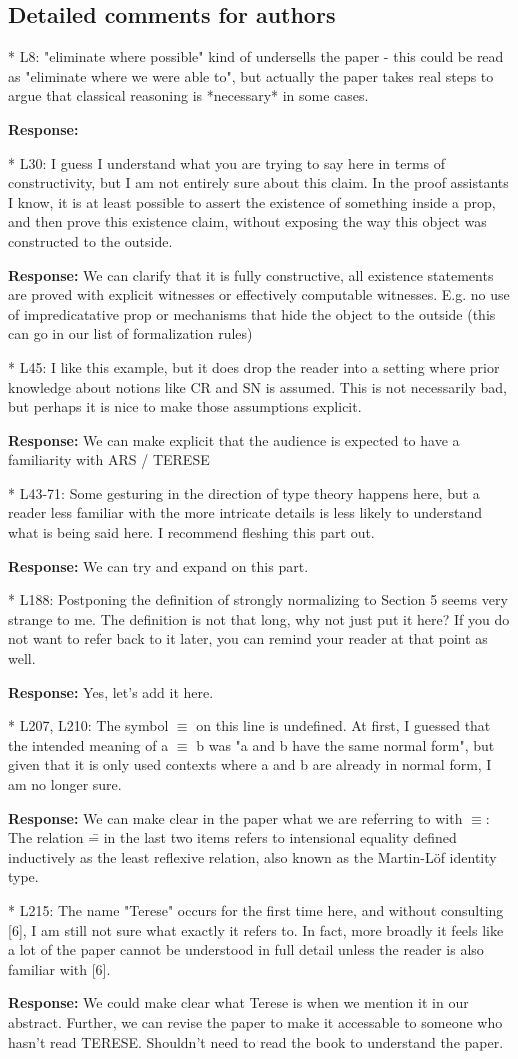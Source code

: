 \documentclass[11pt]{article}
\newcommand{\res}[1]{\par\noindent\textbf{Response:} #1\par}
\begin{document}
\subsection*{Detailed comments for authors}
* L8: "eliminate where possible" kind of undersells the paper - this could be
read as "eliminate where we were able to", but actually the paper takes real
steps to argue that classical reasoning is *necessary* in some cases.
\res{}
* L30: I guess I understand what you are trying to say here in terms of
constructivity, but I am not entirely sure about this claim. In the proof
assistants I know, it is at least possible to assert the existence of
something inside a prop, and then prove this existence claim, without
exposing the way this object was constructed to the outside.
\res{We can clarify that it is fully constructive, all existence statements are proved with explicit witnesses or effectively computable witnesses. E.g. no use of impredicatative prop or mechanisms that hide the object to the outside (this can go in our list of formalization rules)}
* L45: I like this example, but it does drop the reader into a setting where
prior knowledge about notions like CR and SN is assumed. This is not
necessarily bad, but perhaps it is nice to make those assumptions explicit.
\res{We can make explicit that the audience is expected to have a familiarity with ARS / TERESE}
* L43-71: Some gesturing in the direction of type theory happens here, but a
reader less familiar with the more intricate details is less likely to
understand what is being said here. I recommend fleshing this part out.
\res{We can try and expand on this part. }

* L188: Postponing the definition of strongly normalizing to Section 5 seems
very strange to me. The definition is not that long, why not just put it
here? If you do not want to refer back to it later, you can remind your
reader at that point as well.
\res{Yes, let's add it here.}

* L207, L210: The symbol $\equiv$ on this line is undefined. At first, I guessed
that the intended meaning of a $\equiv$ b was "a and b have the same normal
form", but given that it is only used contexts where a and b are already in
normal form, I am no longer sure.
\res{We can make clear in the paper what we are referring to with $\equiv$: The relation \== in the last two items refers to intensional equality defined inductively as the least reflexive relation, also known as the Martin-Löf identity type.}

* L215: The name "Terese" occurs for the first time here, and without
consulting [6], I am still not sure what exactly it refers to. In fact, more
broadly it feels like a lot of the paper cannot be understood in full detail
unless the reader is also familiar with [6].
\res{We could make clear what Terese is when we mention it in our abstract. Further, we can revise the paper to make it accessable to someone who hasn't read TERESE. Shouldn't need to read the book to understand the paper.}
\end{document}
